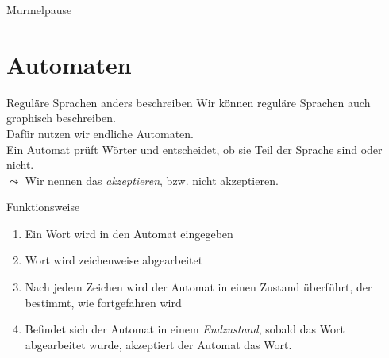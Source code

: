 \begin{frame}[standout]
  Murmelpause
\end{frame}

\section{Automaten}

\begin{frame}[fragile]{Reguläre Sprachen anders beschreiben}
    Wir können reguläre Sprachen auch graphisch beschreiben.\\
    Dafür nutzen wir \alert{endliche Automaten}.\\
    Ein Automat prüft Wörter und entscheidet, ob sie Teil der Sprache sind oder nicht.\\
    $\leadsto$ Wir nennen das \alert{\emph{akzeptieren}}, bzw. nicht akzeptieren.
    \begin{alertblock}{Funktionsweise}
    \begin{enumerate}
        \item Ein Wort wird in den Automat eingegeben
        \item Wort wird zeichenweise abgearbeitet
        \item Nach jedem Zeichen wird der Automat in einen Zustand überführt, der bestimmt, wie fortgefahren wird
        \item Befindet sich der Automat in einem \emph{Endzustand}, sobald das Wort abgearbeitet wurde, akzeptiert der Automat das Wort.
    \end{enumerate}
    \end{alertblock}
\end{frame}

